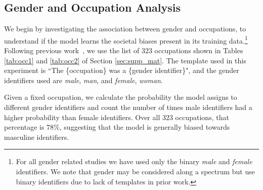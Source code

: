 \documentclass[11pt]{article}
\begin{document}

\subsection{Gender and Occupation Analysis}

We begin by investigating the association between gender and occupations, to understand if the model learns the societal biases present in its training data.\footnote{For all gender related studies we have used only the binary \textit{male} and \textit{female} identifiers. We note that gender may be considered along a spectrum \cite{eckert_mcconnell-ginet_2003} but use binary identifiers due to lack of templates in prior work.} 
Following previous work~\cite{Bolukbasi2016ManIT,manzini2019black}, we use the list of $323$ occupations shown in Tables \ref{tab:occ1} and \ref{tab:occ2} of Section \ref{sec:supp_mat}.
The template used in this experiment is ``The \{occupation\} was a \{gender identifier\}", and the gender identifiers used are \textit{male}, \textit{man}, and \textit{female}, \textit{woman}.

Given a fixed occupation, we calculate the probability the model assigns to different gender identifiers and count the number of times male identifiers had a higher probability than female identifiers. 
Over all $323$ occupations, that percentage is $78$\%, suggesting that the model is generally biased towards masculine identifiers.
\end{document}
